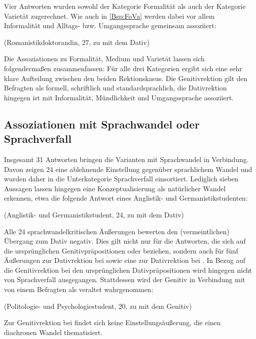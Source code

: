 Vier Antworten wurden sowohl der Kategorie \glqq Formalität\grqq{} als auch der Kategorie \glqq Varietät\grqq{} zugerechnet. 
Wie auch in \autoref{Bsp:FoVa} werden dabei vor allem Informalität und Alltags- bzw. Umgangssprache gemeinsam assoziiert:
\begin{exe}
\ex {} (Romanistikdoktorandin, 27, zu \dank{} mit dem Dativ) \label{Bsp:FoVa}
\end{exe}
Die Assoziationen zu Formalität, Medium und Varietät lassen sich folgendermaßen zusammenfassen: 
Für alle drei Kategorien ergibt sich eine sehr klare Aufteilung zwischen den beiden Rektionskasus. 
Die Genitivrektion gilt den Befragten als formell, schriftlich und standardsprachlich, die Dativrektion hingegen ist mit Informalität, Mündlichkeit und Umgangssprache assoziiert.  
\subsection{Assoziationen mit Sprachwandel oder Sprachverfall}
\label{sec:ErgAssSprachwandel}
Insgesamt 31 Antworten bringen die Varianten mit Sprachwandel in Verbindung. 
Davon zeigen 24 eine ablehnende Einstellung gegenüber sprachlichem Wandel und wurden daher in die Unterkategorie \glqq Sprachverfall\grqq{} einsortiert. 
Lediglich sieben Aussagen lassen hingegen eine Konzeptualisierung als natürlicher Wandel erkennen, etwa die folgende Antwort eines Anglistik- und Germanistikstudenten:
\begin{exe}
\ex {} (Anglistik- und Germanistikstudent, 24, zu \waehrend{} mit dem Dativ)
\end{exe} 
\begin{sloppypar}
\noindent
Alle 24 sprachwandelkritischen Äußerungen bewerten den (vermeintlichen) Übergang zum Dativ negativ. 
Dies gilt nicht nur für die Antworten, die sich auf die ursprünglichen Genitivpräpositionen \waehrend{} oder \wegen{} beziehen, sondern auch für fünf Äußerungen zur Dativrektion bei \dank{} sowie eine zur Dativrektion bei \gegenueber. 
In Bezug auf die Genitivrektion bei den ursprünglichen Dativpräpositionen wird hingegen nicht von Sprachverfall ausgegangen. 
Stattdessen wird der Genitiv in Verbindung mit \gegenueber{} von einem Befragten als veraltet wahrgenommen: 
\end{sloppypar}

\begin{exe}
\ex {} (Politologie- und Psychologiestudent, 20, zu \gegenueber{} mit dem Genitiv) 
\end{exe}
Zur Genitivrektion bei \dank{} findet sich keine Einstellungsäußerung, die einen diachronen Wandel thematisiert. 

